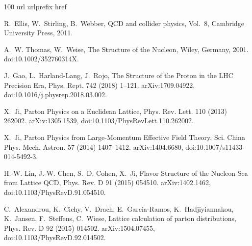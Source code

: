 \begin{thebibliography}{100}
\expandafter\ifx\csname url\endcsname\relax
  \def\url#1{\texttt{#1}}\fi
\expandafter\ifx\csname urlprefix\endcsname\relax\def\urlprefix{URL }\fi
\expandafter\ifx\csname href\endcsname\relax
  \def\href#1#2{#2} \def\path#1{#1}\fi

R.~Ellis, W.~Stirling, B.~Webber, {QCD and collider physics}, Vol.~8, Cambridge
  University Press, 2011.

A.~W. Thomas, W.~Weise, {The Structure of the Nucleon}, Wiley, Germany, 2001.
\newblock \href {https://doi.org/10.1002/352760314X}
  {\path{doi:10.1002/352760314X}}.

J.~Gao, L.~Harland-Lang, J.~Rojo, {The Structure of the Proton in the LHC
  Precision Era}, Phys. Rept. 742 (2018) 1--121.
\newblock \href {http://arxiv.org/abs/1709.04922} {\path{arXiv:1709.04922}},
  \href {https://doi.org/10.1016/j.physrep.2018.03.002}
  {\path{doi:10.1016/j.physrep.2018.03.002}}.

X.~Ji, {Parton Physics on a Euclidean Lattice}, Phys. Rev. Lett. 110 (2013)
  262002.
\newblock \href {http://arxiv.org/abs/1305.1539} {\path{arXiv:1305.1539}},
  \href {https://doi.org/10.1103/PhysRevLett.110.262002}
  {\path{doi:10.1103/PhysRevLett.110.262002}}.

X.~Ji, {Parton Physics from Large-Momentum Effective Field Theory}, Sci. China
  Phys. Mech. Astron. 57 (2014) 1407--1412.
\newblock \href {http://arxiv.org/abs/1404.6680} {\path{arXiv:1404.6680}},
  \href {https://doi.org/10.1007/s11433-014-5492-3}
  {\path{doi:10.1007/s11433-014-5492-3}}.

H.-W. Lin, J.-W. Chen, S.~D. Cohen, X.~Ji, {Flavor Structure of the Nucleon Sea
  from Lattice QCD}, Phys. Rev. D 91 (2015) 054510.
\newblock \href {http://arxiv.org/abs/1402.1462} {\path{arXiv:1402.1462}},
  \href {https://doi.org/10.1103/PhysRevD.91.054510}
  {\path{doi:10.1103/PhysRevD.91.054510}}.

C.~Alexandrou, K.~Cichy, V.~Drach, E.~Garcia-Ramos, K.~Hadjiyiannakou,
  K.~Jansen, F.~Steffens, C.~Wiese, {Lattice calculation of parton
  distributions}, Phys. Rev. D 92 (2015) 014502.
\newblock \href {http://arxiv.org/abs/1504.07455} {\path{arXiv:1504.07455}},
  \href {https://doi.org/10.1103/PhysRevD.92.014502}
  {\path{doi:10.1103/PhysRevD.92.014502}}.


\end{thebibliography}
